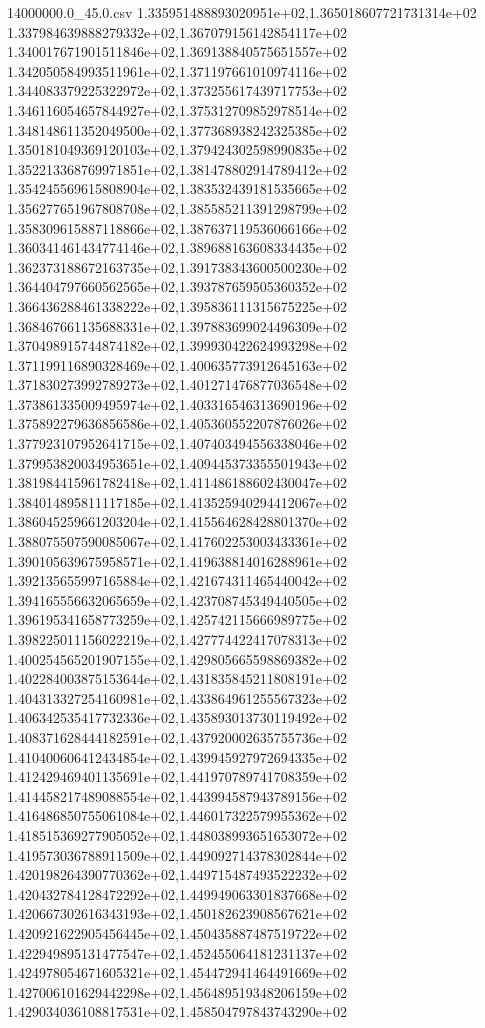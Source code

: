 \begin{filecontents*}{14000000.0_45.0.csv}
1.335951488893020951e+02,1.365018607721731314e+02
1.337984639888279332e+02,1.367079156142854117e+02
1.340017671901511846e+02,1.369138840575651557e+02
1.342050584993511961e+02,1.371197661010974116e+02
1.344083379225322972e+02,1.373255617439717753e+02
1.346116054657844927e+02,1.375312709852978514e+02
1.348148611352049500e+02,1.377368938242325385e+02
1.350181049369120103e+02,1.379424302598990835e+02
1.352213368769971851e+02,1.381478802914789412e+02
1.354245569615808904e+02,1.383532439181535665e+02
1.356277651967808708e+02,1.385585211391298799e+02
1.358309615887118866e+02,1.387637119536066166e+02
1.360341461434774146e+02,1.389688163608334435e+02
1.362373188672163735e+02,1.391738343600500230e+02
1.364404797660562565e+02,1.393787659505360352e+02
1.366436288461338222e+02,1.395836111315675225e+02
1.368467661135688331e+02,1.397883699024496309e+02
1.370498915744874182e+02,1.399930422624993298e+02
1.371199116890328469e+02,1.400635773912645163e+02
1.371830273992789273e+02,1.401271476877036548e+02
1.373861335009495974e+02,1.403316546313690196e+02
1.375892279636856586e+02,1.405360552207876026e+02
1.377923107952641715e+02,1.407403494556338046e+02
1.379953820034953651e+02,1.409445373355501943e+02
1.381984415961782418e+02,1.411486188602430047e+02
1.384014895811117185e+02,1.413525940294412067e+02
1.386045259661203204e+02,1.415564628428801370e+02
1.388075507590085067e+02,1.417602253003433361e+02
1.390105639675958571e+02,1.419638814016288961e+02
1.392135655997165884e+02,1.421674311465440042e+02
1.394165556632065659e+02,1.423708745349440505e+02
1.396195341658773259e+02,1.425742115666989775e+02
1.398225011156022219e+02,1.427774422417078313e+02
1.400254565201907155e+02,1.429805665598869382e+02
1.402284003875153644e+02,1.431835845211808191e+02
1.404313327254160981e+02,1.433864961255567323e+02
1.406342535417732336e+02,1.435893013730119492e+02
1.408371628444182591e+02,1.437920002635755736e+02
1.410400606412434854e+02,1.439945927972694335e+02
1.412429469401135691e+02,1.441970789741708359e+02
1.414458217489088554e+02,1.443994587943789156e+02
1.416486850755061084e+02,1.446017322579955362e+02
1.418515369277905052e+02,1.448038993651653072e+02
1.419573036788911509e+02,1.449092714378302844e+02
1.420198264390770362e+02,1.449715487493522232e+02
1.420432784128472292e+02,1.449949063301837668e+02
1.420667302616343193e+02,1.450182623908567621e+02
1.420921622905456445e+02,1.450435887487519722e+02
1.422949895131477547e+02,1.452455064181231137e+02
1.424978054671605321e+02,1.454472941464491669e+02
1.427006101629442298e+02,1.456489519348206159e+02
1.429034036108817531e+02,1.458504797843743290e+02

\end{filecontents*}
